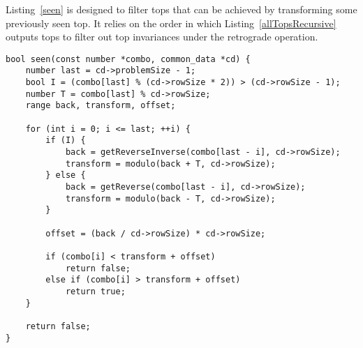 Listing~\ref{seen} is designed to filter tops that can be achieved by transforming some previously seen top. It relies on the order in which Listing~\ref{allTopsRecursive} outputs tops to filter out top invariances under the retrograde operation.

\begin{lstlisting}[caption={Determining whether a top has already been seen.},label={seen}]
bool seen(const number *combo, common_data *cd) {
    number last = cd->problemSize - 1;
    bool I = (combo[last] % (cd->rowSize * 2)) > (cd->rowSize - 1);
    number T = combo[last] % cd->rowSize;
    range back, transform, offset;

    for (int i = 0; i <= last; ++i) {
        if (I) {
            back = getReverseInverse(combo[last - i], cd->rowSize);
            transform = modulo(back + T, cd->rowSize);
        } else {
            back = getReverse(combo[last - i], cd->rowSize);
            transform = modulo(back - T, cd->rowSize);
        }

        offset = (back / cd->rowSize) * cd->rowSize;

        if (combo[i] < transform + offset)
            return false;
        else if (combo[i] > transform + offset)
            return true;
    }

    return false;
}
\end{lstlisting}

